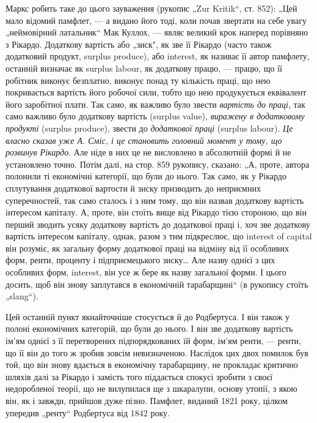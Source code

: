 Маркс робить таке до цього зауваження (рукопис „Zur Kritik“,
ст. 852): „Цей мало відомий памфлет, — а видано його тоді, коли почав
звертати на себе увагу „неймовірний латальник“ Мак Куллох, — являє
великий крок наперед порівняно з Рікардо. Додаткову вартість або
„зиск", як зве її Рікардо (часто також додатковий продукт, surplus
produce), або interest, як називає її автор памфлету, останній визначає як
surplus labour, як додаткову працю, — працю, що її робітник виконує безплатно,
виконує понад ту кількість праці, що нею покривається вартість
його робочої сили, тобто що нею продукується еквівалент його заробітної
плати. Так само, як важливо було звести  \emph{вартість до праці}, так
само важливо було додаткову вартість (surplus value), \emph{виражену в додатковому
продукті} (surplus produce), звести до \emph{додаткової праці}
(surplus labour). \emph{Це власно сказав уже А. Сміс, і це становить головний
момент у тому, що розвинув Рікардо}. Але ніде в них це не
висловлено в абсолютній формі й не установлено точно. Потім далі, на
стор. 859 рукопису, сказано: „А, проте, автора полонили ті економічні
категорії, що були до нього. Так само, як у Рікардо сплутування додаткової
вартости й зиску призводить до неприємних суперечностей, так
само сталось і з ним тому, що він назвав додаткову вартість
інтересом капіталу. А, проте, він стоїть вище від Рікардо тією стороною, що
він перший зводить усяку додаткову вартість до додаткової праці і, хоч зве
додаткову вартість інтересом капіталу, однак, разом з тим підкреслює,
що interest of capital він розуміє, як загальну форму
додаткової праці на відміну від її особливих форм, ренти, проценту і
підприємецького зиску\dots{} Але назву однієї з цих особливих форм, interest,
він усе ж бере як назву загальної форми. І цього досить, щоб він знову
заплутався в економічній тарабарщині“ (в рукопису стоїть „slang“).

Цей останній пункт якнайточніше стосується й до Родбертуса. І він
також у полоні економічних категорій, що були до нього. І він зве
додаткову вартість ім’ям однієї з її перетворених підпорядкованих їй форм,
ім’ям ренти, — ренти, що її він до того ж зробив зовсім невизначеною.
Наслідок цих двох помилок був той, що він знову вдається в економічну
тарабарщину, не прокладає критично шляхів далі за Рікардо і замість
того піддається спокусі зробити з своєї недоробленої теорії, що не
вилупилася ще з шкаралупи, основу утопії, з якою він, як і завжди,
прийшов дуже пізно. Памфлет, виданий 1821 року, цілком упередив
„ренту“ Родбертуса від 1842 року.


